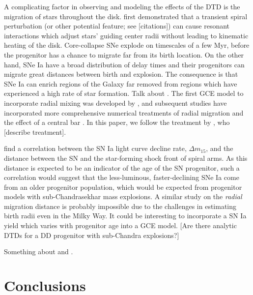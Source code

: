\documentclass[twocolumn,twocolappendix,linenumbers,trackchanges]{aastex631}
\begin{document}
A complicating factor in observing and modeling the effects of the DTD is the migration of stars throughout the disk. \citet{SellwoodBinney2002-RadialMixing} first demonstrated that a transient spiral perturbation (or other potential feature; see [citations]) can cause resonant interactions which adjust stars' guiding center radii without leading to kinematic heating of the disk. Core-collapse SNe explode on timescales of a few Myr, before the progenitor has a chance to migrate far from its birth location. On the other hand, SNe Ia have a broad distribution of delay times and their progenitors can migrate great distances between birth and explosion. The consequence is that SNe Ia can enrich regions of the Galaxy far removed from regions which have experienced a high rate of star formation. Talk about \citet{Scannapieco2005-ChemicalEnrichment}. The first GCE model to incorporate radial mixing was developed by \citet{Schonrich2009-RadialMixing}, and subsequent studies have incorporated more comprehensive numerical treatments of radial migration and the effect of a central bar \citep[e.g.,][]{Minchev2013-ChemodynamicalEvolution}. In this paper, we follow the treatment by , who [describe treatment]. 

\citet{Karapetyan2022-SNIaDistances} find a correlation between the SN Ia light curve decline rate, $\Delta m_{15}$, and the distance between the SN and the star-forming shock front of spiral arms. As this distance is expected to be an indicator of the age of the SN progenitor, such a correlation would suggest that the less-luminous, faster-declining SNe Ia come from an older progenitor population, which would be expected from progenitor models with sub-Chandrasekhar mass explosions. A similar study on the {\it radial} migration distance is probably impossible due to the challenges in estimating birth radii even in the Milky Way. It could be interesting to incorporate a SN Ia yield which varies with progenitor age into a GCE model.
[Are there analytic DTDs for a DD progenitor with sub-Chandra explosions?]

Something about  and \citet{Schonrich2009-RadialMixing}.

\section{Conclusions}
\label{sec:conclusions}
\end{document}
